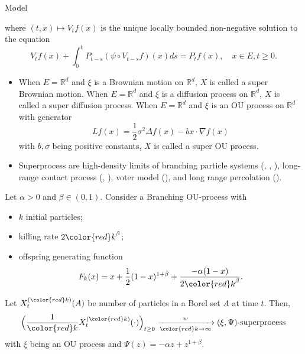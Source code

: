 \documentclass[9pt]{beamer}
\begin{document}
\begin{frame}[allowframebreaks]{Model}
\begin{definition}
	where $(t,x) \mapsto V_tf(x)$ is the unique locally bounded non-negative solution to the equation
\begin{equation}
	V_tf(x) +  \int_0^t P_{t-s}(\psi \circ V_{t-s}f)(x)ds
	= P_tf(x),
    \quad x\in E, t\geq 0.
\end{equation}
\end{definition}
\begin{itemize}
\item
	When $E=\mathbb R^d$ and $\xi$ is a Brownian motion on $\mathbb R^d$, $X$ is called a super Brownian motion. 
	When $E=\mathbb R^d$ and $\xi$ is a diffusion process on $\mathbb R^d$, $X$ is called a super diffusion process. 
	When $E=\mathbb R^d$ and $\xi$ is an OU process on $\mathbb R^d$ with generator
\[
	Lf(x)=\frac{1}{2}\sigma^2\Delta f(x)-bx\cdot \nabla f(x)
\]
	with $b, \sigma$ being positive constants, $X$ is called a super OU process.
\item
	Superprocess are high-density limits of 
	{\color{red} branching particle systems} (\cite{Watanabe1968A-limit}, \cite{Dawson1975Stochastic}, \cite{Dynkin1991Branching}), 
	{\color{red} long-range contact process} (\cite{MullerTribe1995Stochastic}, \cite{DurrettPerkins1999Rescaled}), 
	{\color{red} voter model } (\cite{CoxDurrettPerkins2000Rescaled}), and 
	{\color{red} long range percolation} (\cite{LalleyZheng2010Spatial}). 
\end{itemize}
\begin{example}
	Let $\alpha >0$ and $\beta \in (0,1)$.
	Consider a Branching OU-process with
\begin{itemize}
\item
	{\color{red} $k$} initial particles;
\item
	killing rate  $2{\color{red}k}^\beta$;
\item
	offspring generating function
\[
	F_k(x) =x +\frac{1}{2}(1-x)^{1+\beta} + \frac{-\alpha (1-x)}{2{\color{red}k}^\beta}.
\]
\end{itemize}
	Let $X^{({\color{red} k})}_t(A)$ be number of particles in a Borel set $A$ at time $t$. 
	Then,
\[
	\Big(\frac{1}{\color{red} k} X^{({\color{red} k})}_t(\cdot)\Big)_{t\geq 0}
	\xrightarrow[{\color{red}k}\to \infty]{w} (\xi,\Psi)\text{-superprocess}
\]
	with $\xi$ being an OU process and $\Psi(z) = -\alpha z + z^{1+\beta}$.
\end{example}
\end{frame}
\end{document}
